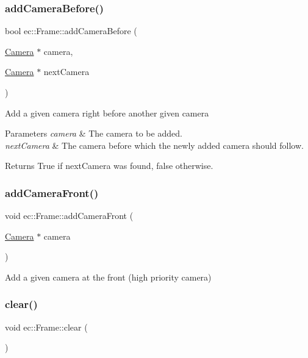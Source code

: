 \subsubsection{\texorpdfstring{add\+Camera\+Before()}{addCameraBefore()}}
{\footnotesize\ttfamily bool ec\+::\+Frame\+::add\+Camera\+Before (\begin{DoxyParamCaption}\item[{\mbox{\hyperlink{classec_1_1_camera}{Camera}} $\ast$}]{camera,  }\item[{\mbox{\hyperlink{classec_1_1_camera}{Camera}} $\ast$}]{next\+Camera }\end{DoxyParamCaption})}

Add a given camera right before another given camera 
\begin{DoxyParams}{Parameters}
{\em camera} & The camera to be added. \\
\hline
{\em next\+Camera} & The camera before which the newly added camera should follow. \\
\hline
\end{DoxyParams}
\begin{DoxyReturn}{Returns}
True if next\+Camera was found, false otherwise. 
\end{DoxyReturn}
\mbox{\label{classec_1_1_frame_abcbaa8a587c8ad75173aacaa853bc5b2}} 
\subsubsection{\texorpdfstring{add\+Camera\+Front()}{addCameraFront()}}
{\footnotesize\ttfamily void ec\+::\+Frame\+::add\+Camera\+Front (\begin{DoxyParamCaption}\item[{\mbox{\hyperlink{classec_1_1_camera}{Camera}} $\ast$}]{camera }\end{DoxyParamCaption})}

Add a given camera at the front (high priority camera) \mbox{\label{classec_1_1_frame_ae9896c9acff0f468a750d9eae784b23b}} 
\subsubsection{\texorpdfstring{clear()}{clear()}}
{\footnotesize\ttfamily void ec\+::\+Frame\+::clear (\begin{DoxyParamCaption}{ }\end{DoxyParamCaption})}

